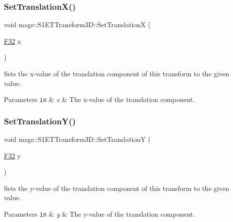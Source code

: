 \subsubsection{\texorpdfstring{Set\+Translation\+X()}{SetTranslationX()}}
{\footnotesize\ttfamily void mage\+::\+S1\+E\+T\+Transform3\+D\+::\+Set\+TranslationX (\begin{DoxyParamCaption}\item[{\mbox{\hyperlink{namespacemage_aa97e833b45f06d60a0a9c4fc22ae02c0}{F32}}}]{x }\end{DoxyParamCaption})\hspace{0.3cm}{\ttfamily [noexcept]}}

Sets the x-\/value of the translation component of this transform to the given value.


\begin{DoxyParams}[1]{Parameters}
\mbox{\tt in}  & {\em x} & The x-\/value of the translation component. \\
\hline
\end{DoxyParams}
\mbox{\label{classmage_1_1_s1_e_t_transform3_d_ab7f7d39bfb3b97bd4183681ef427de4e}} 
\subsubsection{\texorpdfstring{Set\+Translation\+Y()}{SetTranslationY()}}
{\footnotesize\ttfamily void mage\+::\+S1\+E\+T\+Transform3\+D\+::\+Set\+TranslationY (\begin{DoxyParamCaption}\item[{\mbox{\hyperlink{namespacemage_aa97e833b45f06d60a0a9c4fc22ae02c0}{F32}}}]{y }\end{DoxyParamCaption})\hspace{0.3cm}{\ttfamily [noexcept]}}

Sets the y-\/value of the translation component of this transform to the given value.


\begin{DoxyParams}[1]{Parameters}
\mbox{\tt in}  & {\em y} & The y-\/value of the translation component. \\
\hline
\end{DoxyParams}
\mbox{\label{classmage_1_1_s1_e_t_transform3_d_a745c49e47f3ad1f790f0e21ced772cbc}} 
